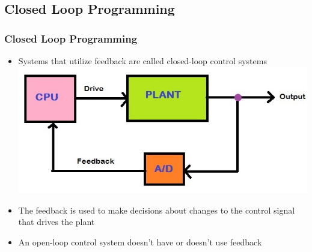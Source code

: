 \documentclass[table,10pt,red]{beamer}
\begin{document}
%	
	
	
	


\subsection{Closed Loop Programming}
\begin{frame}[shrink=2]
	\frametitle{Closed Loop Programming} \pause
	\begin{itemize}
		\item<+-|alert@+> Systems that utilize feedback are called closed-loop control systems  \pause \\[10pt] 
		\includegraphics[width =\linewidth]{closed_loop_feedback} \pause \\[10pt]
		\item<+-|alert@+> The feedback is used to make decisions about changes to the control signal that drives the plant \\[10pt]
		\item<+-|alert@+> An open-loop control system doesn't have or doesn't use feedback \\[10pt]
	\end{itemize}
\end{frame}
\end{document}
